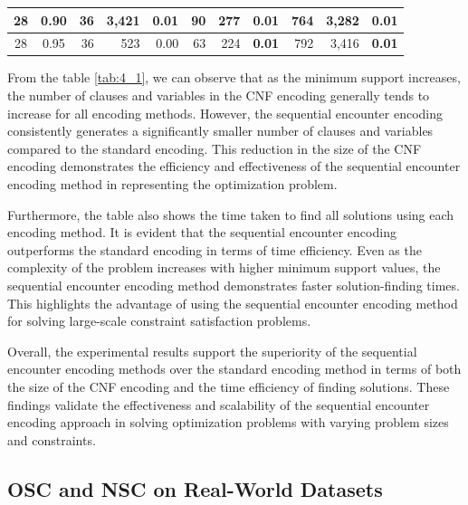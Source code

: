 \begin{table}[H]
\begin{tabular}{|c|c|r|r|r|r|r|r|r|r|r|}
        28                              & 0.90                              & 36                                     & 3,421                             & 0.01                              & 90            & 277              & \textbf{0.01} & 764           & 3,282            & \textbf{0.01} \\ \hline
        28                              & 0.95                              & 36                                     & 523                               & 0.00                              & 63            & 224              & \textbf{0.01} & 792           & 3,416            & \textbf{0.01} \\ \hline
    \end{tabular}
\end{table}

From the table \ref{tab:4_1}, we can observe that as the minimum support increases,
the number of clauses and variables in the CNF encoding generally tends to increase for all encoding methods.
However, the sequential encounter encoding consistently generates a significantly smaller number of clauses and variables compared to the standard encoding.
This reduction in the size of the CNF encoding demonstrates the efficiency and effectiveness of the sequential encounter encoding method in representing the optimization problem.

Furthermore, the table also shows the time taken to find all solutions using each encoding method.
It is evident that the sequential encounter encoding outperforms the standard encoding in terms of time efficiency.
Even as the complexity of the problem increases with higher minimum support values, the sequential encounter encoding method demonstrates faster solution-finding times.
This highlights the advantage of using the sequential encounter encoding method for solving large-scale constraint satisfaction problems.

Overall, the experimental results support the superiority of the sequential encounter encoding methods over the standard encoding method in terms of both the size of the CNF encoding and the time efficiency of finding solutions. These findings validate the effectiveness and scalability of the sequential encounter encoding approach in solving optimization problems with varying problem sizes and constraints.

\subsection{OSC and NSC on Real-World Datasets}

